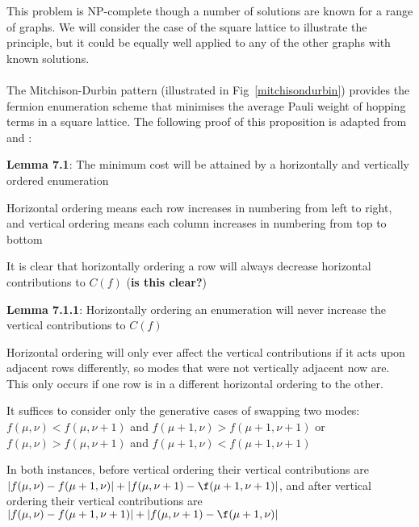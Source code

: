 \documentclass[twoside]{article}
\begin{document}
               This problem is NP-complete \cite{edgesum} though a number of solutions are known for a range of graphs. We will consider the case of the square lattice to illustrate the principle, but it could be equally well applied to any of the other graphs with known solutions.\\\\
               The Mitchison-Durbin pattern (illustrated in Fig~\ref{mitchisondurbin}) provides the fermion enumeration scheme that minimises the average Pauli weight of hopping terms in a square lattice. The following proof of this proposition is adapted from \cite{fermionicEncoding} and \cite{mitchisondurbin}:
               \begin{itemlist}
               \item \textbf{Lemma 7.1}: The minimum  cost will be attained by a horizontally and vertically ordered enumeration
                       \begin{alphlist}
                       \item Horizontal ordering means each row increases in numbering from left to right, and vertical ordering means each column increases in numbering from top to bottom
                       \item It is clear that horizontally ordering a row will always decrease horizontal contributions to $C(f)$ (\textbf{is this clear?})
                       \item \textbf{Lemma 7.1.1}: Horizontally ordering an enumeration will never increase the vertical contributions to $C(f)$
                               \begin{romanlist}
                               \item Horizontal ordering will only ever affect the vertical contributions if it acts upon adjacent rows differently, so modes that were not vertically adjacent now are. This only occurs if one row is in a different horizontal ordering to the other.
                               \item It suffices to consider only the generative cases of swapping two modes: \\$f(\mu, \nu) < f(\mu, \nu+1)$ and $f(\mu+1, \nu) > f(\mu+1, \nu+1)$ or\\ $f(\mu, \nu) > f(\mu, \nu+1)$ and $f(\mu+1, \nu) < f(\mu+1, \nu+1)$
                               \item In both instances, before vertical ordering their vertical contributions are $|f(\mu,\nu) -f(\mu+1, \nu)| + |f(\mu, \nu+1) - \f(\mu+1, \nu+1)|$, and after vertical ordering their vertical contributions are $|f(\mu,\nu) -f(\mu+1, \nu+1)| + |f(\mu, \nu+1) - \f(\mu+1, \nu)|$

\end{romanlist}
\end{alphlist}
\end{itemlist}
\end{document}
